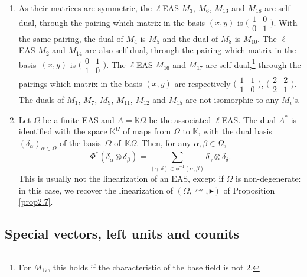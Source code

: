 \documentclass[10pt,a4paper]{amsart}
\numberwithin{equation}{section}
\begin{document}
\begin{Example}\quad
\begin{enumerate}\itemsep=0pt
\item[(1)] As their matrices are symmetric, the $\ell$EAS $M_3$, $M_6$, $M_{13}$ and $M_{18}$ are self-dual, through the pairing which matrix in the basis $(x,y)$ is
$\bigl(\begin{smallmatrix}
1&0\\0&1
\end{smallmatrix}\bigr)$.
With the same pairing, the dual of $M_4$ is $M_5$ and the dual of $M_8$ is $M_{10}$. The $\ell$EAS $M_2$ and $M_{14}$ are also self-dual, through the pairing which matrix in the basis~$(x,y)$ is
$\bigl(\begin{smallmatrix}
0&1\\1&0
\end{smallmatrix}\bigr)$.
The $\ell$EAS $M_{16}$ and $M_{17}$ are self-dual,\footnote{For $M_{17}$, this holds if the characteristic of the base field is not 2.} through the pairings which matrix in the basis $(x,y)$ are respectively
$\bigl(\begin{smallmatrix}
1&1\\1&0
\end{smallmatrix}\bigr)$, $\bigl(\begin{smallmatrix}
2&2\\2&1
\end{smallmatrix}\bigr)$.
The duals of $M_1$, $M_7$, $M_9$, $M_{11}$, $M_{12}$ and $M_{15}$ are not isomorphic to any $M_i$'s.
\item[(2)] Let $\Omega$ be a finite EAS and $A=\mathbb{K}\Omega$ be the associated $\ell$EAS. The dual $A^*$ is identified with the space $\mathbb{K}^\Omega$ of maps from $\Omega$ to $\mathbb{K}$, with the dual basis $(\delta_\alpha)_{\alpha \in \Omega}$ of the basis~$\Omega$ of~$\mathbb{K}\Omega$.
Then, for any $\alpha,\beta \in \Omega$,
\[
\Phi^*(\delta_\alpha\otimes \delta_\beta)=\sum_{(\gamma,\delta)\in \phi^{-1}(\alpha,\beta)} \delta_\gamma \otimes \delta_\delta.
\]
This is usually not the linearization of an EAS, except if $\Omega$ is non-degenerate: in this case, we recover the linearization of $(\Omega,\curvearrowright,\blacktriangleright)$ of Proposition \ref{prop2.7}.
\end{enumerate}\end{Example}

\subsection{Special vectors, left units and counits}
\end{document}
